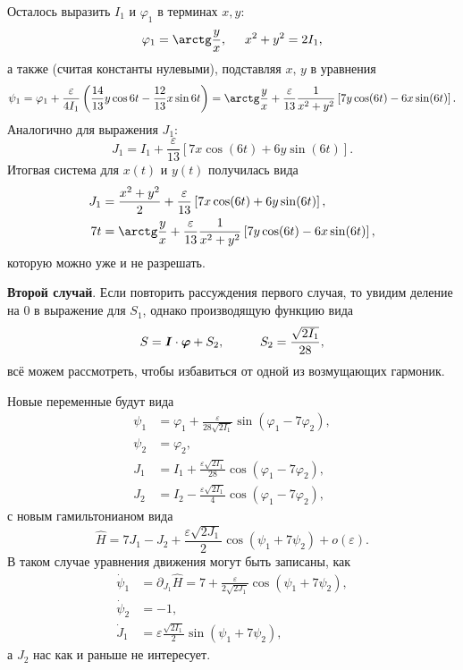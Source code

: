 Осталось выразить $I_1$ и $\varphi_1$ в терминах $x, y$:
\begin{equation*}
    \varphi_1 = \arctg \frac{y}{x}, \hspace{5 mm} x^2 + y^2 = 2 I_1,
\end{equation*}
а также (считая константы нулевыми), подставляя $x,\, y$ в уравнения
\begin{equation*}
    \psi_1 = \varphi_1 + \frac{\varepsilon}{4 I_1}\left(
        \frac{14}{13} y \cos 6 t - \frac{12}{13} x \sin 6 t
    \right) = 
    \arctg \frac{y}{x} + \frac{\varepsilon}{13} \frac{1}{x^2+y^2} \left[
        7 y \cos(6t) - 6 x \sin(6t)
    \right].
\end{equation*}
Аналогично для выражения $J_1$:
\begin{equation*}
    J_1 = I_1 + \frac{\varepsilon}{13}\left[
        7 x \cos (6 t) + 6 y \sin (6t)
    \right].
\end{equation*}
Итогвая система для $x(t)$ и $y(t)$ получилась вида
\begin{align*}
    J_1 &= \frac{x^2+y^2}{2} + \frac{\varepsilon}{13}\left[
        7 x \cos (6 t) + 6 y \sin (6t)
    \right], \\
    7 t &= \arctg \frac{y}{x} + \frac{\varepsilon}{13} \frac{1}{x^2+y^2} \left[
        7 y \cos(6t) - 6 x \sin(6t)
    \right],
\end{align*}
которую можно уже и не разрешать.


\textbf{Второй случай}. Если повторить рассуждения первого случая, то увидим деление на $0$ в выражение для $S_1$, однако производящую функцию вида
\begin{equation*}
    S = \vc{I} \cdot \vc{\varphi} + S_2,
    \hspace{10 mm} 
    S_2 = \frac{\sqrt{2I_1}}{28},
\end{equation*}
всё можем рассмотреть, чтобы избавиться от одной из возмущающих гармоник.

Новые переменные будут вида
\begin{align*}
    \psi_1 &= \varphi_1 + \frac{\varepsilon}{28 \sqrt{2I_1}} \sin(\varphi_1 - 7 \varphi_2), \\
    \psi_2 &= \varphi_2, \\
    J_1 &= I_1 + \frac{\varepsilon \sqrt{2I_1}}{28} \cos\left(\varphi_1 - 7 \varphi_2\right), \\
    J_2 &= I_2 - \frac{\varepsilon \sqrt{2 I_1}}{4} \cos\left(\varphi_1 - 7 \varphi_2\right),
\end{align*}
с новым гамильтонианом вида
\begin{equation*}
    \hat{H} = 7 J_1 - J_2 + \frac{\varepsilon \sqrt{2 J_1}}{2} \cos(\psi_1 + 7 \psi_2) + o(\varepsilon).
\end{equation*}
В таком случае уравнения движения могут быть записаны, как
\begin{align*}
    \dot{\psi}_1 &= \partial_{J_1} \hat{H} = 7 + \frac{\varepsilon}{2 \sqrt{2 J_1}} \cos (\psi_1 + 7 \psi_2), \\
    \dot{\psi}_2 &= -1, \\
    \dot{J}_1 &= \varepsilon \frac{\sqrt{2 I_1}}{2} \sin(\psi_1 + 7 \psi_2),
\end{align*}
а $J_2$ нас как и раньше не интересует. 

